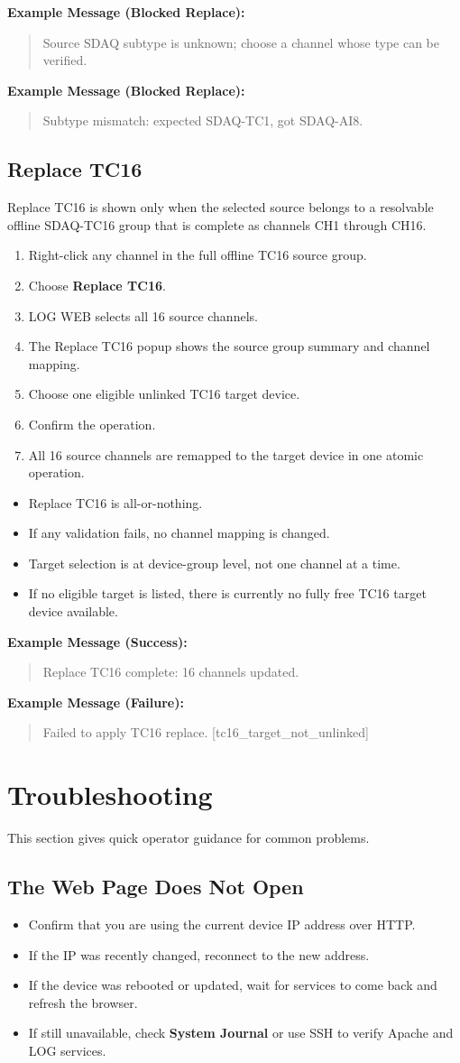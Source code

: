 \documentclass[11pt,a4paper]{article}
\newcommand{\messageexample}[2]{%
\noindent\textbf{Example Message (#1):}\\%
\begin{quote}\raggedright #2\end{quote}%
}
\begin{document}
\messageexample{Blocked Replace}{Source SDAQ subtype is unknown; choose a channel whose type can be verified.}
\messageexample{Blocked Replace}{Subtype mismatch: expected SDAQ-TC1, got SDAQ-AI8.}

\subsection{Replace TC16}
Replace TC16 is shown only when the selected source belongs to a resolvable offline SDAQ-TC16 group that is complete as channels CH1 through CH16.

\begin{enumerate}
\item Right-click any channel in the full offline TC16 source group.
\item Choose \textbf{Replace TC16}.
\item LOG WEB selects all 16 source channels.
\item The Replace TC16 popup shows the source group summary and channel mapping.
\item Choose one eligible unlinked TC16 target device.
\item Confirm the operation.
\item All 16 source channels are remapped to the target device in one atomic operation.
\end{enumerate}

\begin{itemize}
\item Replace TC16 is all-or-nothing.
\item If any validation fails, no channel mapping is changed.
\item Target selection is at device-group level, not one channel at a time.
\item If no eligible target is listed, there is currently no fully free TC16 target device available.
\end{itemize}

\messageexample{Success}{Replace TC16 complete: 16 channels updated.}
\messageexample{Failure}{Failed to apply TC16 replace. [tc16\_target\_not\_unlinked]}

\section{Troubleshooting}
This section gives quick operator guidance for common problems.

\subsection{The Web Page Does Not Open}
\begin{itemize}
\item Confirm that you are using the current device IP address over HTTP.
\item If the IP was recently changed, reconnect to the new address.
\item If the device was rebooted or updated, wait for services to come back and refresh the browser.
\item If still unavailable, check \textbf{System Journal} or use SSH to verify Apache and LOG services.
\end{itemize}
\end{document}
